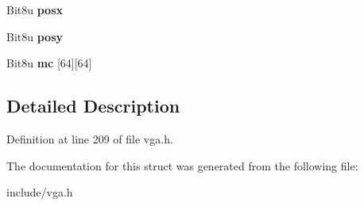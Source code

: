 \begin{DoxyCompactItemize}
\item 
\hypertarget{structVGA__HWCURSOR_abf50682342447c46dd13676cd0596281}{Bit8u {\bfseries posx}}\label{structVGA__HWCURSOR_abf50682342447c46dd13676cd0596281}

\item 
\hypertarget{structVGA__HWCURSOR_a436c666c0e7ef856d7ca98a6e5f30bd0}{Bit8u {\bfseries posy}}\label{structVGA__HWCURSOR_a436c666c0e7ef856d7ca98a6e5f30bd0}

\item 
\hypertarget{structVGA__HWCURSOR_a8c67327cfdedc8e3cb9a1a1d4d1d0e20}{Bit8u {\bfseries mc} \mbox{[}64\mbox{]}\mbox{[}64\mbox{]}}\label{structVGA__HWCURSOR_a8c67327cfdedc8e3cb9a1a1d4d1d0e20}

\end{DoxyCompactItemize}


\subsection{Detailed Description}


Definition at line 209 of file vga.\-h.



The documentation for this struct was generated from the following file\-:\begin{DoxyCompactItemize}
\item 
include/vga.\-h\end{DoxyCompactItemize}

